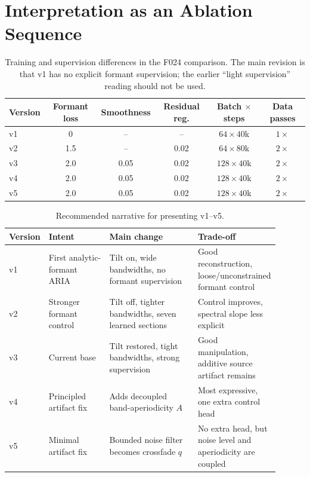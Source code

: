 \documentclass[11pt]{article}
\newcommand{\ap}{A}
\begin{document}
\section{Interpretation as an Ablation Sequence}

\begin{table}[H]
\centering
\small
\begin{tabular}{@{}lccccc@{}}
\toprule
Version & Formant loss & Smoothness & Residual reg. & Batch $\times$ steps & Data passes \\
\midrule
v1 & 0 & -- & -- & $64\times40$k & $1\times$ \\
v2 & 1.5 & -- & 0.02 & $64\times80$k & $2\times$ \\
v3 & 2.0 & 0.05 & 0.02 & $128\times40$k & $2\times$ \\
v4 & 2.0 & 0.05 & 0.02 & $128\times40$k & $2\times$ \\
v5 & 2.0 & 0.05 & 0.02 & $128\times40$k & $2\times$ \\
\bottomrule
\end{tabular}
\caption{Training and supervision differences in the F024 comparison. The main
revision is that v1 has no explicit formant supervision; the earlier ``light
supervision'' reading should not be used.}
\label{tab:training}
\end{table}

\begin{table}[H]
\centering
\small
\begin{tabular}{@{}L{0.09\linewidth}L{0.23\linewidth}L{0.34\linewidth}L{0.24\linewidth}@{}}
\toprule
Version & Intent & Main change & Trade-off \\
\midrule
v1 & First analytic-formant ARIA & Tilt on, wide bandwidths, no formant supervision & Good reconstruction, loose/unconstrained formant control \\
v2 & Stronger formant control & Tilt off, tighter bandwidths, seven learned sections & Control improves, spectral slope less explicit \\
v3 & Current base & Tilt restored, tight bandwidths, strong supervision & Good manipulation, additive source artifact remains \\
v4 & Principled artifact fix & Adds decoupled band-aperiodicity $\ap$ & Most expressive, one extra control head \\
v5 & Minimal artifact fix & Bounded noise filter becomes crossfade $q$ & No extra head, but noise level and aperiodicity are coupled \\
\bottomrule
\end{tabular}
\caption{Recommended narrative for presenting v1--v5.}
\end{table}
\end{document}
